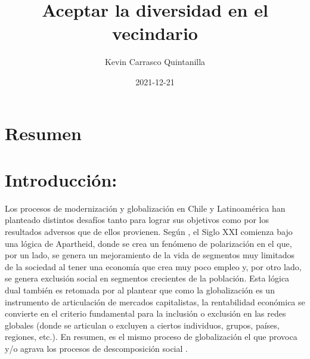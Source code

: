 \documentclass[12pt,twoside]{templates/facsothesis}
\title{Aceptar la diversidad en el vecindario}
\author{Kevin Carrasco Quintanilla}
\date{2021-12-21}
\begin{document}

  \maketitle

\frontmatter %
\pagestyle{empty} %



  \setcounter{tocdepth}{1}
  \setlength{\parskip}{0pt}
  \tableofcontents

\setlength\parskip{1em plus 0.1em minus 0.2em}

  \listoftables

  \listoffigures



\mainmatter %
\pagestyle{fancyplain} %

\hypertarget{resumen}{%
\chapter{Resumen}\label{resumen}}

\hypertarget{introducciuxf3n}{%
\chapter{Introducción:}\label{introducciuxf3n}}

Los procesos de modernización y globalización en Chile y Latinoamérica han planteado distintos desafíos tanto para lograr sus objetivos como por los resultados adversos que de ellos provienen. Según \citet{sunkel_sostenibilidad_1998}, el Siglo XXI comienza bajo una lógica de Apartheid, donde se crea un fenómeno de polarización en el que, por un lado, se genera un mejoramiento de la vida de segmentos muy limitados de la sociedad al tener una economía que crea muy poco empleo y, por otro lado, se genera exclusión social en segmentos crecientes de la población. Esta lógica dual también es retomada por \citet{castells_globalizacion_2005} al plantear que como la globalización es un instrumento de articulación de mercados capitalistas, la rentabilidad económica se convierte en el criterio fundamental para la inclusión o exclusión en las redes globales (donde se articulan o excluyen a ciertos individuos, grupos, países, regiones, etc.). En resumen, es el mismo proceso de globalización el que provoca y/o agrava los procesos de descomposición social \citep{lechner_debate_1992}.
\end{document}
